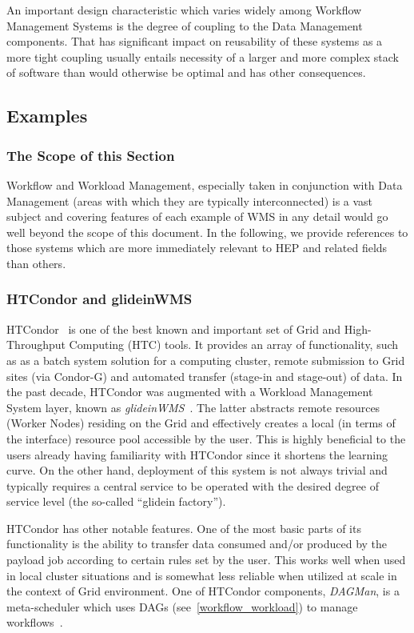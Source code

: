 An important design characteristic which varies widely among Workflow Management Systems is the degree of coupling to the Data Management components. That has significant impact
on reusability of these systems as a more tight coupling usually entails necessity of a larger and more complex stack of software than would otherwise be optimal and has other consequences.

\subsection{Examples}
\label{wms_examples}
\subsubsection{The Scope of this Section}
Workflow and Workload Management, especially taken in conjunction with Data Management (areas with which they are typically interconnected) is a vast
subject and  covering features of each example of WMS in any detail would go well beyond the scope of this document. In the following, we provide references
to those systems which are more immediately relevant to HEP and related fields than others.

\subsubsection{HTCondor and glideinWMS}
\label{htcondor}
HTCondor~\cite{htcondor} is one of the best known and  important set of Grid and High-Throughput Computing (HTC) tools. It provides an array of functionality, such as
as a batch system solution for a computing cluster, remote submission to Grid sites (via Condor-G) and automated transfer (stage-in and stage-out) of data.
In the past decade, HTCondor was augmented with a  Workload Management System layer, known as \textit{glideinWMS}~\cite{glideinwms}. The latter abstracts remote resources (Worker Nodes)
residing on the Grid and effectively creates a local (in terms of the interface) resource pool accessible by the user.
This is highly beneficial to the users already having familiarity with HTCondor since it shortens the learning curve.
On the other hand, deployment of this system is not always trivial and typically requires a central service to be operated with the desired degree of service level (the so-called ``glidein factory'').

HTCondor has other notable features. One of the most basic parts of its functionality is the ability to transfer data consumed and/or produced by the payload job according to certain rules set by the user. This works well
when used in local cluster situations and is somewhat less reliable when utilized at scale in the context of Grid environment. One of HTCondor components, \textit{DAGMan}, is a meta-scheduler
which uses DAGs (see~\ref{workflow_workload}) to manage workflows~\cite{dagman}.

